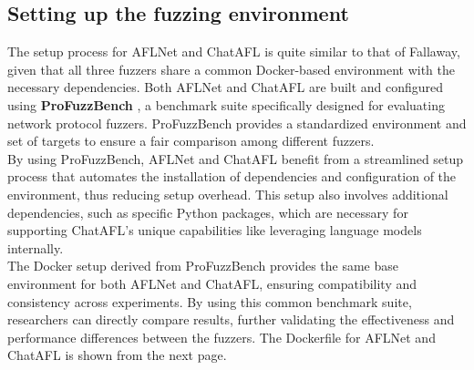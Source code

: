 \subsection{Setting up the fuzzing environment}

The setup process for AFLNet and ChatAFL is quite similar to that of Fallaway, given that all three fuzzers share a common Docker-based environment with the necessary dependencies. Both AFLNet and ChatAFL are built and configured using \textbf{ProFuzzBench} \cite{profuzzbench}, a benchmark suite specifically designed for evaluating network protocol fuzzers. ProFuzzBench provides a standardized environment and set of targets to ensure a fair comparison among different fuzzers.
\\By using ProFuzzBench, AFLNet and ChatAFL benefit from a streamlined setup process that automates the installation of dependencies and configuration of the environment, thus reducing setup overhead. This setup also involves additional dependencies, such as specific Python packages, which are necessary for supporting ChatAFL's unique capabilities like leveraging language models internally.
\\The Docker setup derived from ProFuzzBench provides the same base environment for both AFLNet and ChatAFL, ensuring compatibility and consistency across experiments. By using this common benchmark suite, researchers can directly compare results, further validating the effectiveness and performance differences between the fuzzers.
The Dockerfile for AFLNet and ChatAFL is shown from the next page.
\\\\
